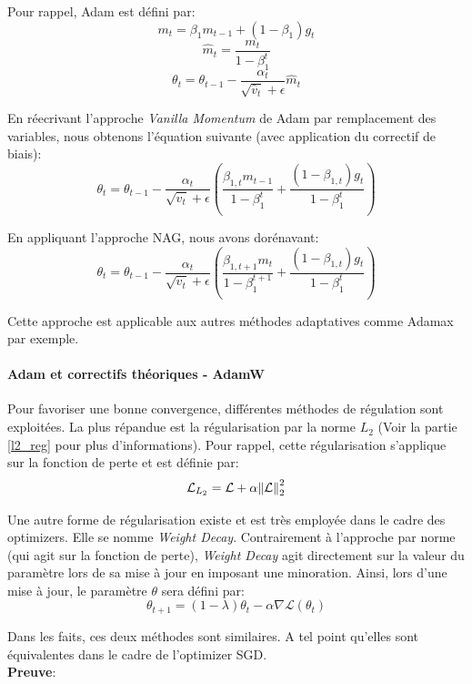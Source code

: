 \noindent Pour rappel, Adam est défini par:
$$m_t = \beta_1 m_{t-1} + (1 - \beta_1) g_t$$
$$\hat{m}_t = \frac{m_t}{1 - \beta^t_1}$$
$$\theta_{t} = \theta_{t-1} - \frac{\alpha_t}{\sqrt{\hat{v}_t} + \epsilon} \hat{m}_t$$

\noindent En réecrivant l'approche \textit{Vanilla Momentum} de Adam par remplacement des variables, nous obtenons l'équation suivante (avec application du correctif de biais):
$$\theta_{t} = \theta_{t-1} - \dfrac{\alpha_t}{\sqrt{\hat{v}_t} + \epsilon} (\dfrac{\beta_{1,t} m_{t-1}}{1 - \beta^{t}_1} + \dfrac{(1 - \beta_{1,t}) g_t}{1 - \beta^t_1})$$

\noindent En appliquant l'approche NAG, nous avons dorénavant:
$$\theta_{t} = \theta_{t-1} - \dfrac{\alpha_t}{\sqrt{\hat{v}_t} + \epsilon} (\dfrac{\beta_{1,t+1} m_{t}}{1 - \beta^{t+1}_1} + \dfrac{(1 - \beta_{1,t}) g_t}{1 - \beta^t_1})$$

\noindent Cette approche est applicable aux autres méthodes adaptatives comme Adamax par exemple.

\paragraph{Adam et correctifs théoriques - AdamW}

\noindent Pour favoriser une bonne convergence, différentes méthodes de régulation sont exploitées. La plus répandue est la régularisation par la norme $L_2$ (Voir la partie \ref{l2_reg} pour plus d'informations). Pour rappel, cette régularisation s'applique sur la fonction de perte et est définie par:
$$ \mathcal{L}_{L_2}=\mathcal{L} + \alpha \norm*{\mathcal{L}}_2^2$$

\noindent Une autre forme de régularisation existe et est très employée dans le cadre des optimizers. Elle se nomme \textit{Weight Decay}\cite{weight_decay}. Contrairement à l'approche par norme (qui agit sur la fonction de perte), \textit{Weight Decay} agit directement sur la valeur du paramètre lors de sa mise à jour en imposant une minoration. Ainsi, lors d'une mise à jour, le paramètre $\theta$ sera défini par:
$$\theta_{t+1}=(1-\lambda)\theta_t-\alpha \nabla \mathcal{L}(\theta_t)$$

\noindent Dans les faits, ces deux méthodes sont similaires. A tel point qu'elles sont équivalentes dans le cadre de l'optimizer SGD.\\

\noindent \textbf{Preuve}: \\

